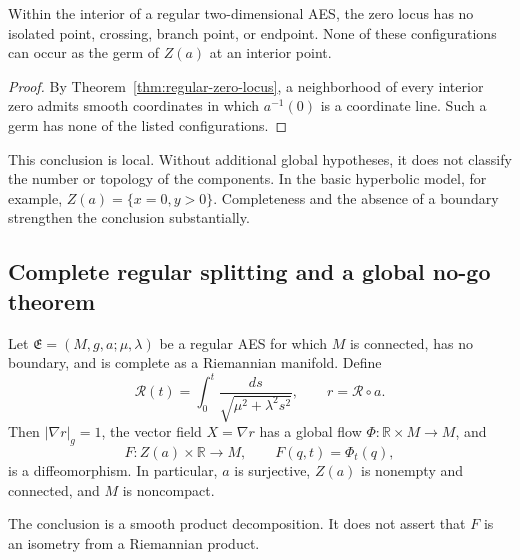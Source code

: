 \begin{corollary}\label{cor:regular-zero-rigidity}
Within the interior of a regular two-dimensional AES, the zero locus has no
isolated point, crossing, branch point, or endpoint.  None of these configurations
can occur as the germ of \(Z(a)\) at an interior point.
\end{corollary}

\begin{proof}
By Theorem~\ref{thm:regular-zero-locus}, a neighborhood of every interior zero
admits smooth coordinates in which \(a^{-1}(0)\) is a coordinate line.  Such a
germ has none of the listed configurations.
\end{proof}

This conclusion is local.  Without additional global hypotheses, it does not
classify the number or topology of the components.  In the basic hyperbolic
model, for example, \(Z(a)=\{x=0,y>0\}\).  Completeness and the absence of a
boundary strengthen the conclusion substantially.

\subsection{Complete regular splitting and a global no-go theorem}

\begin{theorem}
\label{thm:complete-regular-aes-splitting}
Let \(\mathfrak E=(M,g,a;\mu,\lambda)\) be a regular AES for which \(M\) is
connected, has no boundary, and is complete as a Riemannian manifold.  Define
\begin{equation}
  \mathcal R(t)
    =\int_0^t\frac{ds}{\sqrt{\mu^2+\lambda^2s^2}},
  \qquad
  r=\mathcal R\circ a.
  \label{eq:complete-aes-rectification}
\end{equation}
Then \(|\nabla r|_g=1\), the vector field \(X=\nabla r\) has a global flow
\(\Phi:\mathbb R\times M\to M\), and
\begin{equation}
  F:Z(a)\times\mathbb R\longrightarrow M,
  \qquad
  F(q,t)=\Phi_t(q),
  \label{eq:complete-aes-splitting-map}
\end{equation}
is a diffeomorphism.  In particular, \(a\) is surjective, \(Z(a)\) is nonempty
and connected, and \(M\) is noncompact.

The conclusion is a smooth product decomposition.  It does not assert that
\(F\) is an isometry from a Riemannian product.
\end{theorem}

